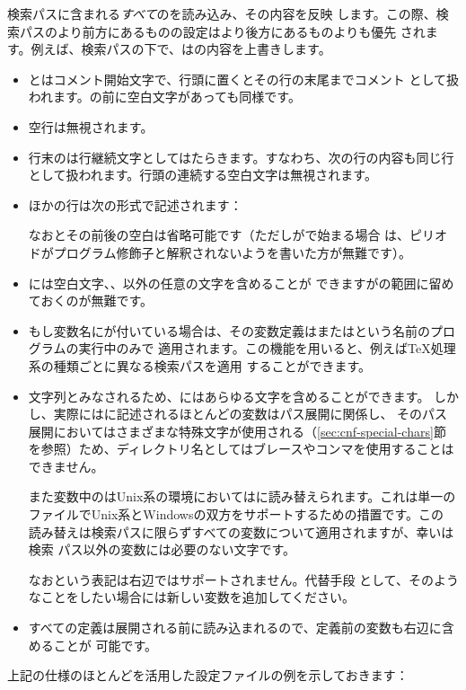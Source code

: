 \documentclass[uplatex,dvipdfmx,12pt,tombow]{jsarticle}
\begin{document}
\KPS 検索パスに含まれる\emph{すべて}のを読み込み、その内容を反映
します。この際、検索パスのより前方にあるものの設定はより後方にあるものよりも優先
されます。例えば、検索パスの下で、はの内容を上書きします。

\begin{itemize}
\item \code{\%}と\code{\#}はコメント開始文字で、行頭に置くとその行の末尾までコメント
  として扱われます。\code{\%}の前に空白文字があっても同様です。
\item 空行は無視されます。
\item 行末の\code{\bs}は行継続文字としてはたらきます。すなわち、次の行の内容も同じ行
  として扱われます。行頭の連続する空白文字は無視されます。
\item ほかの行は次の形式で記述されます：
%
\begin{alltt}
   \optional{=} 
\end{alltt}
%
  なお\samp{=}とその前後の空白は省略可能です（ただしがで始まる場合
  は、ピリオドがプログラム修飾子と解釈されないよう\samp{=}を書いた方が無難です）。
\item {}には空白文字、\samp{=}、以外の任意の文字を含めることが
  できますがの範囲に留めておくのが無難です。
\item もし変数名にが付いている場合は、その変数定義はまたはという名前のプログラムの実行中のみで
  適用されます。この機能を用いると、例えば\TeX 処理系の種類ごとに異なる検索パスを適用
  することができます。
\item 文字列とみなされるため、にはあらゆる文字を含めることができます。
  しかし、実際にはに記述されるほとんどの変数はパス展開に関係し、
  そのパス展開においてはさまざまな特殊文字が使用される（\ref{sec:cnf-special-chars}節
  を参照）ため、ディレクトリ名としてはブレースやコンマを使用することはできません。
  
  また変数中の\samp{;}はUnix系の環境においては\samp{:}に読み替えられます。これは単一の
  ファイルでUnix系とWindowsの双方をサポートするための措置です。この
  読み替えは検索パスに限らずすべての変数について適用されますが、幸い\samp{;}は検索
  パス以外の変数には必要のない文字です。
  
  なおという表記は右辺ではサポートされません。代替手段
  として、そのようなことをしたい場合には新しい変数を追加してください。
\item すべての定義は展開される前に読み込まれるので、定義前の変数も右辺に含めることが
  可能です。
\end{itemize}
%
上記の仕様のほとんどを活用した設定ファイルの例を示しておきます：
%

\end{document}
